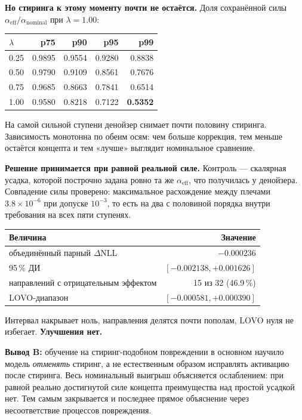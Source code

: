 \documentclass[10pt,a4paper]{article}
\begin{document}
\textbf{Но стиринга к этому моменту почти не остаётся.} Доля сохранённой силы
$\alpha_{\mathrm{eff}}/\alpha_{\mathrm{nominal}}$ при $\lambda = 1.00$:

\begin{center}\small
\begin{tabular}{@{}lrrrr@{}}
\toprule
$\lambda$ & p75 & p90 & p95 & p99\\
\midrule
0.25 & 0.9895 & 0.9554 & 0.9280 & 0.8838\\
0.50 & 0.9790 & 0.9109 & 0.8561 & 0.7676\\
0.75 & 0.9685 & 0.8663 & 0.7841 & 0.6514\\
1.00 & 0.9580 & 0.8218 & 0.7122 & \textbf{0.5352}\\
\bottomrule
\end{tabular}
\end{center}

\medskip
На самой сильной ступени денойзер снимает почти половину стиринга. Зависимость
монотонна по обеим осям: чем больше коррекция, тем меньше остаётся концепта и
тем «лучше» выглядит номинальное сравнение.

\textbf{Решение принимается при равной реальной силе.} Контроль — скалярная
усадка, которой построчно задана ровно та же $\alpha_{\mathrm{eff}}$, что
получилась у денойзера. Совпадение силы проверено: максимальное расхождение
между плечами $3.8\times10^{-6}$ при допуске $10^{-3}$, то есть на два с
половиной порядка внутри требования на всех пяти ступенях.

\begin{center}\small
\begin{tabular}{@{}lr@{}}
\toprule
Величина & Значение\\
\midrule
объединённый парный $\Delta$NLL & $-0.000236$\\
95\,\% ДИ & $[-0.002138, +0.001626]$\\
направлений с отрицательным эффектом & 15 из 32 (46.9\,\%)\\
LOVO-диапазон & $[-0.000581, +0.000390]$\\
\bottomrule
\end{tabular}
\end{center}

\medskip
Интервал накрывает ноль, направления делятся почти пополам, LOVO нуля не
избегает. \textbf{Улучшения нет.}

\textbf{Вывод B:} обучение на стиринг-подобном повреждении в основном научило
модель \emph{отменять} стиринг, а не естественным образом исправлять
активацию после стиринга. Весь номинальный выигрыш объясняется ослаблением: при
равной реально достигнутой силе концепта преимущества над простой усадкой нет.
Тем самым закрывается и последнее прямое объяснение через несоответствие
процессов повреждения.
\end{document}
